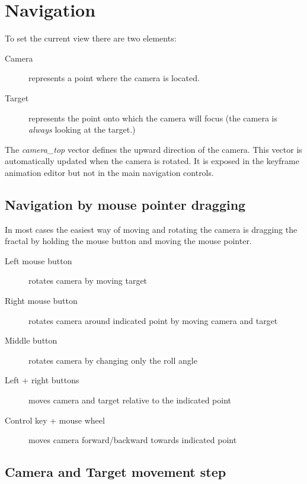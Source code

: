 \section{Navigation}\label{navigation}

To set the current view there are two elements:

\begin{description}
	\item[Camera] represents a point where the camera is located.
	\item[Target] represents the point onto which the camera will focus (the
	camera is \emph{always} looking at the target.)
\end{description}

The \emph{camera\_top} vector defines the upward direction of the camera. This vector is automatically updated when the camera is rotated. It is exposed in the keyframe animation editor but not in the main navigation controls.

\subsection{Navigation by mouse pointer dragging}\label{navigation-by-mouse-pointer-dragging} 

In most cases the easiest way of moving and rotating the camera is dragging the fractal by holding the mouse button and moving the mouse pointer.

\begin{description}
	\item[Left mouse button] rotates camera by moving target
	\item[Right mouse button] rotates camera around indicated point by moving camera and target
	\item[Middle button] rotates camera by changing only the roll angle
	\item[Left + right buttons] moves camera and target relative to the indicated point
	\item[Control key + mouse wheel] moves camera forward/backward towards indicated point
\end{description}

\subsection{Camera and Target movement step}\label{camera-and-target-movement-step}

